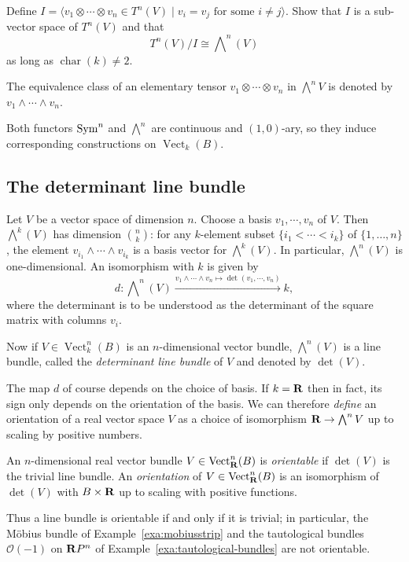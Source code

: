 \documentclass[a4paper,openany]{scrbook}
\DeclareMathOperator{\Vect}{Vect}
\DeclareMathOperator{\chr}{char}
\newcommand{\exterior}{\bigwedge\nolimits}
\begin{document}
\begin{exer}
Define $I = \langle v_1 \otimes \cdots \otimes v_n \in T^n(V) \mid v_i=v_j \text{ for some }i\neq j\rangle$. Show that $I$ is a sub-vector space of $T^n(V)$ and that
\[
T^n(V)/I \cong \exterior^n(V)
\]
as long as $\chr(k) \neq 2$.
\end{exer}

The equivalence class of an elementary tensor $v_1 \otimes \cdots \otimes v_n$ in $\exterior^nV$ is denoted by $v_1 \wedge \cdots \wedge v_n$. 

Both functors $\operatorname{Sym}^n$ and $\exterior^n$ are continuous and $(1,0)$-ary, so they induce corresponding constructions on $\Vect_k(B)$.

\subsection{The determinant line bundle}

Let $V$ be a vector space of dimension $n$. Choose a basis $v_1,\cdots,v_n$ of $V$. Then $\exterior^k(V)$ has dimension $n \choose k$: for any $k$-element subset $\{i_1<\cdots<i_k\}$ of $\{1,\dots,n\}$, the element $v_{i_1} \wedge \cdots \wedge v_{i_k}$ is a basis vector for $\exterior^k(V)$. In particular, $\exterior^n(V)$ is one-dimensional. An isomorphism with $k$ is given by
\[
d\colon \exterior^n(V) \xrightarrow{v_1 \wedge \cdots \wedge v_n \mapsto \det(v_1,\cdots,v_n)} k,
\]
where the determinant is to be understood as the determinant of the square matrix with columns $v_i$. 

Now if $V \in \Vect^n_k(B)$ is an $n$-dimensional vector bundle, $\exterior^n(V)$ is a line bundle, called the \emph{determinant line bundle} of $V$ and denoted by $\det(V)$.

The map $d$ of course depends on the choice of basis. If $k=\mathbf R$ then in fact, its sign only depends on the orientation of the basis. We can therefore \emph{define} an orientation of a real vector space $V$ as a choice of isomorphism $\R \to \exterior^nV$ up to scaling by positive numbers.

\begin{defn}
An $n$-dimensional real vector bundle $V \in \Vect^n_\R(B)$ is \emph{orientable} if $\det(V)$ is the trivial line bundle. An \emph{orientation} of $V \in \Vect^n_\R(B)$ is an isomorphism of $\det(V)$ with $B \times \mathbf R$ up to scaling with positive functions.
\end{defn}

Thus a line bundle is orientable if and only if it is trivial; in particular, the Möbius bundle of Example~\ref{exa:mobiusstrip} and the tautological bundles $\mathcal O(-1)$ on $\mathbf R P^n$ of Example~\ref{exa:tautological-bundles} are not orientable.
\end{document}
